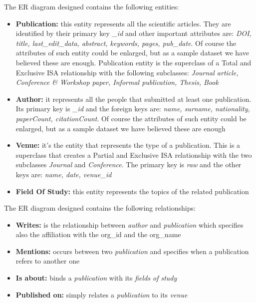 \documentclass{Configuration_Files/PoliMi3i_thesis}
\begin{document}
\newpage
The ER diagram designed contains the following entities:
\begin{itemize}
    \item \textbf{Publication:} this entity represents all the scientific articles. They are identified by their primary key \emph{\_id}
            and other important attributes are: \emph{DOI, title, last\_edit\_data, abstract, keywords, pages, pub\_date}.
            Of course the attributes of such entity could be enlarged, but as a sample dataset we have believed these are enough.
            Publication entity is the superclass of a Total and Exclusive ISA relationship with the following subclasses:
            \emph{Journal article, Conference \& Workshop paper, Informal publication, Thesis, Book}
    \item \textbf{Author:} it represents all the people that submitted at least one publication. Its primary key is \emph{\_id} and the
            foreign keys are: \emph{name, surname, nationality, paperCount, citationCount}.
            Of course the attributes of such entity could be enlarged, but as a sample dataset we have believed these are enough
    \item \textbf{Venue:} it's the entity that represents the type of a publication. This is a superclass that creates a Partial and Exclusive
            ISA relationship with the two subclasses \emph{Journal} and \emph{Conference}.
            The primary key is \emph{raw} and the other keys are: \emph{name, date, venue\_id}
    \item \textbf{Field Of Study:} this entity represents the topics of the related publication
\end{itemize}
\bigskip

The ER diagram designed contains the following relationships:
\begin{itemize}
    \item \textbf{Writes:} is the relationship between \emph{author} and \emph{publication} which specifies also the affiliation
            with the org\_id and the org\_name
    \item \textbf{Mentions:} occurs between two \emph{publication} and specifies when a publication refers to another one
    \item \textbf{Is about:} binds a \emph{publication} with its \emph{fields of study}
    \item \textbf{Published on:} simply relates a \emph{publication} to its \emph{venue}
\end{itemize}
\end{document}
